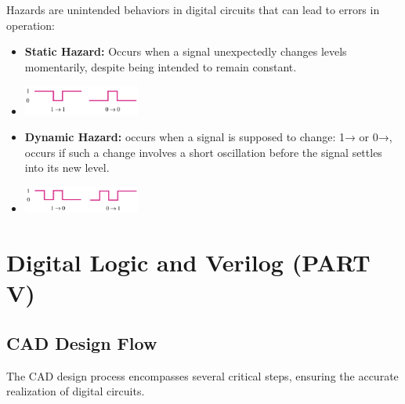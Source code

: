 \documentclass[12pt,openany, tikz,border=10pt]{book}
\begin{document}
Hazards are unintended behaviors in digital circuits that can lead to errors in operation:
\begin{itemize}
    \item[] \textbf{Static Hazard:} Occurs when a signal unexpectedly changes levels momentarily, despite being intended to remain constant.
    \item[] 
        \centering
        \includegraphics[width=0.3\textwidth]{circuits/9.5.png}
       
        
    \item[] \textbf{Dynamic Hazard:} occurs
    when a signal is supposed to
    change: 1\;→ or 0\;→, occurs if such a change
    involves a short oscillation before
    the signal settles into its new level.
    \item[] 
        \centering
        \includegraphics[width=0.3\textwidth]{circuits/9.5_1.png}
\end{itemize}

\chapter{Digital Logic and Verilog (PART V)}

\section{CAD Design Flow}
The CAD design process encompasses several critical steps, ensuring the accurate realization of digital circuits. 
\end{document}
